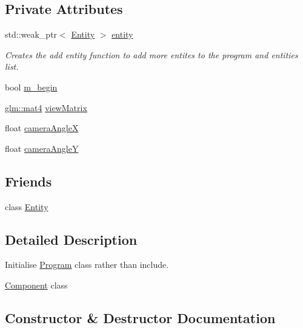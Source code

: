 \subsection*{Private Attributes}
\begin{DoxyCompactItemize}
\item 
std\+::weak\+\_\+ptr$<$ \mbox{\hyperlink{class_aspect_1_1_engine_1_1_entity}{Entity}} $>$ \mbox{\hyperlink{class_aspect_1_1_engine_1_1_component_adc1d5c50c770bd9a173c0d63a61fe46c}{entity}}
\begin{DoxyCompactList}\small\item\em Creates the add entity function to add more entites to the program and entities list. \end{DoxyCompactList}\item 
bool \mbox{\hyperlink{class_aspect_1_1_engine_1_1_component_a648bedde21f792635f87889357fa2965}{m\+\_\+begin}}
\item 
\mbox{\hyperlink{group__core__types_ga7dcd2365c2e368e6af5b7adeb6a9c8df}{glm\+::mat4}} \mbox{\hyperlink{class_aspect_1_1_engine_1_1_component_a8307884a0e42764fd72af572e4ffdc7f}{view\+Matrix}}
\item 
float \mbox{\hyperlink{class_aspect_1_1_engine_1_1_component_ae5201488df91c23147632cc507b36c82}{camera\+AngleX}}
\item 
float \mbox{\hyperlink{class_aspect_1_1_engine_1_1_component_a9767131422976b1fb5b253c1ac114981}{camera\+AngleY}}
\end{DoxyCompactItemize}
\subsection*{Friends}
\begin{DoxyCompactItemize}
\item 
class \mbox{\hyperlink{class_aspect_1_1_engine_1_1_component_a614439ccac0344926adc4c0165d64060}{Entity}}
\end{DoxyCompactItemize}


\subsection{Detailed Description}
Initialise \mbox{\hyperlink{class_aspect_1_1_engine_1_1_program}{Program}} class rather than include. 

\mbox{\hyperlink{class_aspect_1_1_engine_1_1_component}{Component}} class 

\subsection{Constructor \& Destructor Documentation}
\mbox{\label{class_aspect_1_1_engine_1_1_component_a8ceb47c002468c4ad876b7220da579f8}} 
